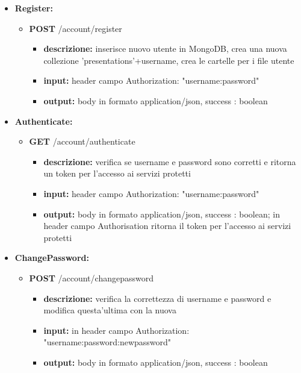 {{\begin{itemize}
		\item \textbf{Register:}
			\begin{itemize}
			\item  \textbf{POST} /account/register 
				\begin{itemize} 
				\item \textbf{descrizione:} inserisce nuovo utente in MongoDB, crea una nuova collezione 'presentations'+username, crea le cartelle per i file utente
				\item \textbf{input:} header campo Authorization: "username:password"
				\item \textbf{output:} body in formato application/json, success : boolean
				\end{itemize}
			\end{itemize}
			
		\item \textbf{Authenticate:}
			\begin{itemize}
			\item  \textbf{GET} /account/authenticate 
				\begin{itemize} 
				\item \textbf{descrizione:} verifica se username e password sono corretti e ritorna un token per l'accesso ai servizi protetti
				\item \textbf{input:} header campo Authorization: "username:password"
				\item \textbf{output:}  body in formato application/json, success : boolean; in header campo Authorisation ritorna il token per l'accesso ai servizi protetti 
				\end{itemize}
			\end{itemize}
				
		\item \textbf{ChangePassword:}
			\begin{itemize}
			\item  \textbf{POST} /account/changepassword 
				\begin{itemize} 
				\item \textbf{descrizione:} verifica la correttezza di username e password e modifica questa'ultima con la nuova 
				\item \textbf{input:} in header campo Authorization: "username:password:newpassword"
				\item \textbf{output:} body in formato application/json, success : boolean  
				\end{itemize}
			\end{itemize}
			

\end{itemize}}}
